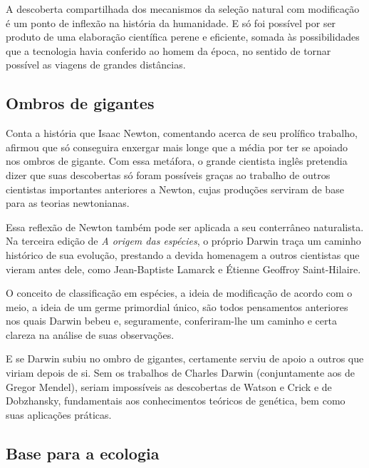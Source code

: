 \documentclass[11pt]{extarticle}
\begin{document}


A descoberta compartilhada dos mecanismos da seleção natural com modificação
é um ponto de inflexão na história da humanidade. E só foi possível por ser
produto de uma elaboração científica perene e eficiente, somada às
possibilidades que a tecnologia havia conferido ao homem da época, no sentido
de tornar possível as viagens de grandes distâncias.




\subsection{Ombros de gigantes}

Conta a história que Isaac Newton, comentando acerca de seu prolífico trabalho,
afirmou que só conseguira enxergar mais longe que a média por ter se apoiado
nos ombros de gigante. Com essa metáfora, o grande cientista inglês pretendia
dizer que suas descobertas só foram possíveis graças ao trabalho de outros
cientistas importantes anteriores a Newton, cujas produções serviram de base
para as teorias newtonianas.

Essa reflexão de Newton também pode ser aplicada a seu conterrâneo naturalista.
Na terceira edição de \emph{A origem das espécies}, o próprio Darwin traça um
caminho histórico de sua evolução, prestando a devida homenagem a outros
cientistas que vieram antes dele, como Jean-Baptiste Lamarck e Étienne Geoffroy
Saint-Hilaire.

O conceito de classificação em espécies, a ideia de modificação de acordo com
o meio, a ideia de um germe primordial único, são todos pensamentos anteriores
nos quais Darwin bebeu e, seguramente, conferiram-lhe um caminho e certa
clareza na análise de suas observações.

E se Darwin subiu no ombro de gigantes, certamente serviu de apoio a outros que
viriam depois de si. Sem os trabalhos de Charles Darwin (conjuntamente aos de
Gregor Mendel), seriam impossíveis as descobertas de Watson e Crick e de
Dobzhansky, fundamentais aos conhecimentos teóricos de genética, bem como suas
aplicações práticas.

\subsection{Base para a ecologia}
\end{document}

